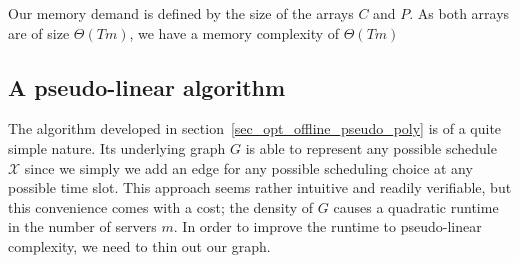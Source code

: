 \documentclass[hidelinks]{article}
\theoremstyle{plain}
\theoremstyle{definition}
\theoremstyle{rem}
\newcommand{\mx}{\mathcal{X}}
\begin{document}
Our memory demand is defined by the size of the arrays $C$ and $P$. As both arrays are of size $\Theta(Tm)$, we have a memory complexity of $\Theta(Tm)$

\subsection{A pseudo-linear algorithm}\label{sec_opt_offline_pseudo_lin}
The algorithm developed in section~\ref{sec_opt_offline_pseudo_poly} is of a quite simple nature. Its underlying graph $G$ is able to represent any possible schedule $\mx$ since we simply we add an edge for any possible scheduling choice at any possible time slot. This approach seems rather intuitive and readily verifiable, but this convenience comes with a cost; the density of $G$ causes a quadratic runtime in the number of servers $m$. In order to improve the runtime to pseudo-linear complexity, we need to thin out our graph. 
\end{document}
